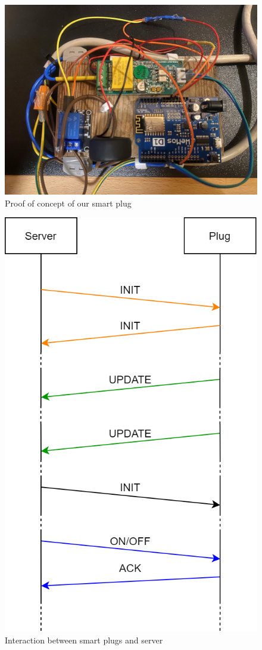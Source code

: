 \documentclass[conference]{IEEEtran}
\begin{document}
	\begin{figure}
		\centering
		\includegraphics[width=\linewidth]{assets/IMG_5348}
		\caption{Proof of concept of our smart plug}
		\label{fig:img5348}
	\end{figure}
	\begin{figure}[htbp]
		\centering
		\includegraphics[width=0.7\linewidth]{assets/plugserverinteraction}
		\caption{Interaction between smart plugs and server}
		\label{fig:plugserverinteraction}
	\end{figure}
	
\end{document}

